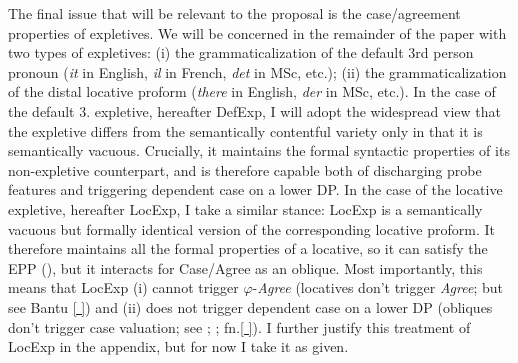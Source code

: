 \documentclass[11pt, letterpaper]{paper_nick}
\newcommand{\fm}[1]{[$\circ$#1$\circ$]}
\begin{document}

The final issue that will be relevant to the proposal is the case/agreement properties of expletives. We will be concerned in the remainder of the paper with two types of expletives: (i) the grammaticalization of the default 3rd person pronoun (\emph{it} in English, \emph{il} in French, \emph{det} in MSc, etc.); (ii) the grammaticalization of the distal locative proform (\emph{there} in English, \emph{der} in MSc, etc.). In the case of the default 3. expletive, hereafter DefExp, I will adopt the widespread view that the expletive differs from the semantically contentful variety only in that it is semantically vacuous. Crucially, it maintains the formal syntactic  properties of its non-expletive counterpart, and is therefore capable both of discharging probe features and triggering dependent case on a lower DP. 
In the case of the locative expletive, hereafter LocExp, I take a similar stance: LocExp is a semantically vacuous but formally identical version of the corresponding locative proform. It therefore maintains all the formal properties of a locative, so it can satisfy the EPP (\citealt{bresnan94}), but it interacts for Case/Agree as an oblique. Most importantly, this means that LocExp (i) cannot trigger $\varphi$-\emph{Agree} (locatives don't trigger \emph{Agree}; but see Bantu \ref{ }) and (ii) does not trigger dependent case on a lower DP (obliques don't trigger case valuation; see \citealt{bobaljik08}; \citealt{preminger14}; fn.\ref{ }). I further justify this treatment of LocExp in the appendix, but for now I take it as given. 
\end{document}
